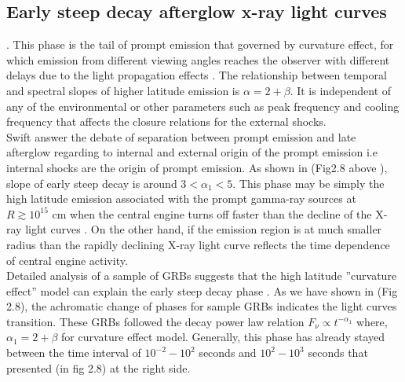 \subsection{Early  steep  decay afterglow x-ray light curves}.
This phase is the tail of prompt emission that governed by curvature
effect, for which emission from different viewing angles reaches the observer with
different delays due to the light propagation effects \citep{33}. The relationship between temporal and spectral slopes of higher latitude emission is $\alpha  = 2 + \beta $. It is independent of any of the environmental or other parameters such as peak frequency and cooling frequency that affects the closure relations for the external shocks. \citep{34}\\
Swift answer the debate of separation between prompt emission and late afterglow
regarding to internal and external origin of the prompt emission i.e internal
shocks are the origin of prompt emission.\citep{33} \citep{34}  As shown in (Fig2.8 above ), slope of early steep decay is around $3 < \alpha_{1} < 5$.
This phase may be simply the high latitude emission associated with the prompt
gamma-ray sources at $ R \gtrsim 10^{15} $ cm when the central engine turns off faster than the decline of the X-ray light curves . On the other hand, if the emission region is at much smaller radius than the rapidly declining X-ray light curve reflects the time dependence of central engine activity.\citep{35}\citep{36}\\
Detailed analysis of a sample of GRBs suggests that the high latitude ”curvature
effect” model can explain the early steep decay phase \citep{37}. As we have shown in
(Fig 2.8), the achromatic change of phases for sample GRBs indicates the light
curves transition. These GRBs followed the decay power law relation $ F_{\nu}\propto  t^{-\alpha_{1}} $ where, $ \alpha_{1}  = 2 + \beta $ for curvature effect model. Generally, this phase has already stayed between the time interval of $ 10^{-2}  - 10^{2} $ seconds and $ 10^{2} - 10^{3} $ seconds that  presented (in fig 2.8) at the right side.\\\ 
